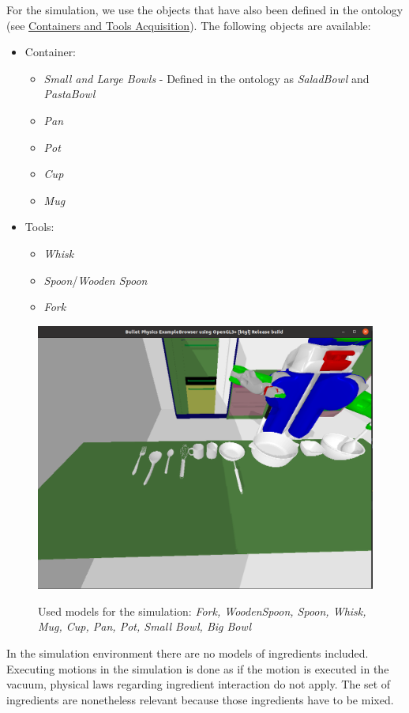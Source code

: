 For the simulation, we use the objects that have also been defined in the ontology (see \hyperref[sec:ContainersAndToolsAcquisition]{Containers and Tools Acquisition}).
The following objects are available:
\begin{itemize}
	\item Container: 
        \begin{itemize} 
            \item \textit{Small and Large Bowls} - Defined in the ontology as \textit{SaladBowl} and \textit{PastaBowl}
            \item \textit{Pan}
            \item \textit{Pot}
            \item \textit{Cup}
            \item \textit{Mug}
        \end{itemize}
	\item Tools: 
        \begin{itemize}
            \item \textit{Whisk}
            \item \textit{Spoon}/\textit{Wooden Spoon}
            \item \textit{Fork}
        \end{itemize}
\end{itemize}

\begin{figure}[H]
    \includegraphics[scale=0.35]{Graphics/toolscontainersmodels.png}
    \label{fig:toolscontainersmodels}
    \caption{Used models for the simulation: \textit{Fork, WoodenSpoon, Spoon, Whisk, Mug, Cup, Pan, Pot, Small Bowl, Big Bowl}}
\end{figure}
In the simulation environment there are no models of ingredients included. Executing motions in the simulation is done as if the motion is executed in 
the vacuum, physical laws regarding ingredient interaction do not apply. The set of ingredients are nonetheless relevant because those ingredients have to be mixed.

